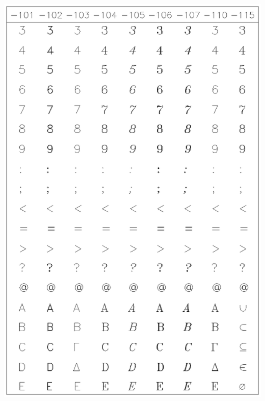 \documentclass[11pt]{article}
\begin{document}
\includegraphics[height=0.95\textheight]{sun83-c2.eps}
\end{document}
